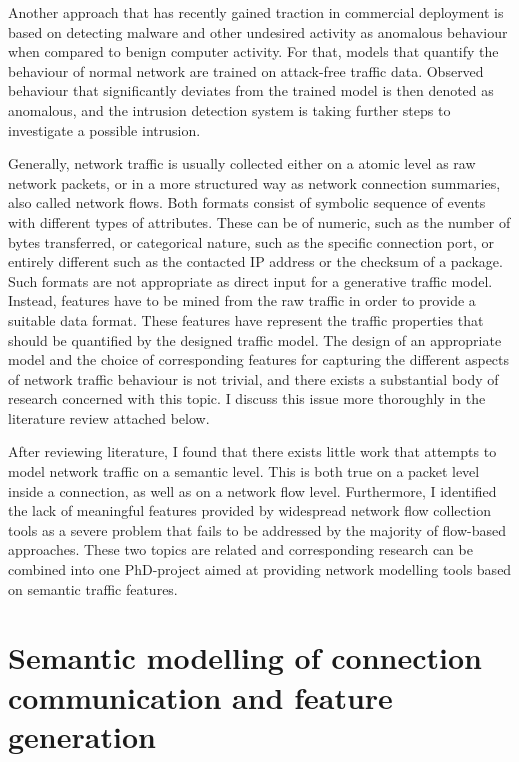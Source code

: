 \documentclass[a4paper,12pt,twoside]{article}
\begin{document}
Another approach that has recently gained traction in commercial deployment is based on detecting malware and other undesired activity as anomalous behaviour when compared to benign computer activity. For that, models that quantify the behaviour of normal network are trained on attack-free traffic data. Observed behaviour that significantly deviates from the trained model is then denoted as anomalous, and the intrusion detection system is taking further steps to investigate a possible intrusion. 

Generally, network traffic is usually collected either on a atomic level as raw network packets, or in a more structured way as network connection summaries, also called network flows. Both formats consist of symbolic sequence of events with different types of attributes. These can be of numeric, such as the number of bytes transferred, or categorical nature, such as the specific connection port, or entirely different such as the contacted IP address or the checksum of a package. Such formats are not appropriate as direct input for a generative traffic model. Instead, features have to be mined from the raw traffic in order to provide a suitable data format. These features have represent the traffic properties that should be quantified by the designed traffic model. The design of an appropriate model and the choice of corresponding features for capturing the different aspects of network traffic behaviour is not trivial, and there exists a substantial body of research concerned with this topic. I discuss this issue more thoroughly in the literature review attached below.


After reviewing literature, I found that there exists little work that attempts to model network traffic on a semantic level. This is both true on a packet level inside a connection, as well as on a network flow level. Furthermore, I identified the lack of meaningful features provided by widespread network flow collection tools as a severe problem that fails to be addressed by the majority of flow-based approaches. These two topics are related and corresponding research can be combined into one PhD-project aimed at providing network modelling tools based on semantic traffic features.

\section{Semantic modelling of connection communication and feature generation}
\end{document}
